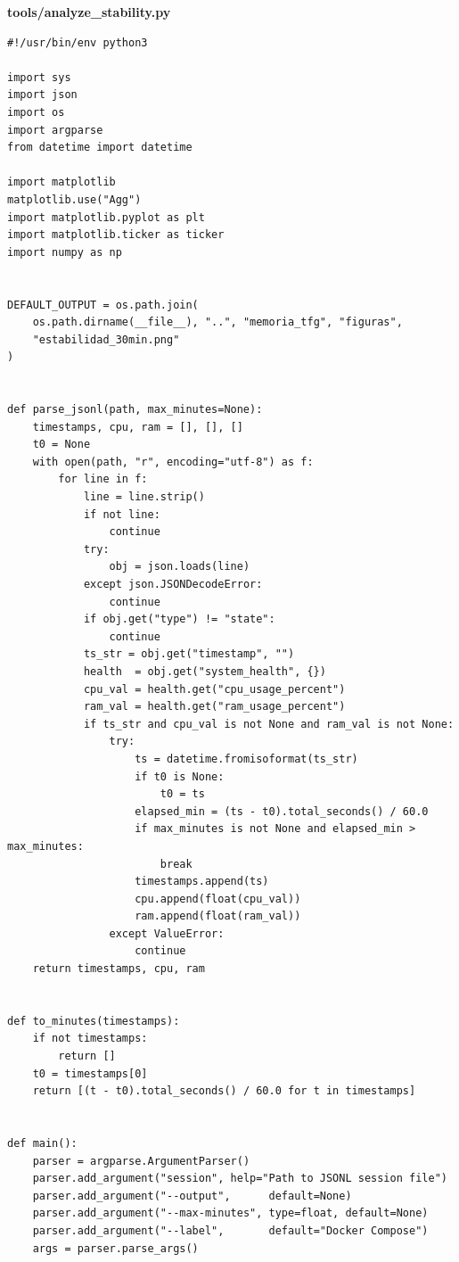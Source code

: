 \clearpage
\vspace{0.3cm}
\noindent\textbf{\small tools/analyze\_stability.py}
\vspace{0.1cm}

\begin{lstlisting}[style=codefile, language=python3]
#!/usr/bin/env python3

import sys
import json
import os
import argparse
from datetime import datetime

import matplotlib
matplotlib.use("Agg")
import matplotlib.pyplot as plt
import matplotlib.ticker as ticker
import numpy as np


DEFAULT_OUTPUT = os.path.join(
    os.path.dirname(__file__), "..", "memoria_tfg", "figuras",
    "estabilidad_30min.png"
)


def parse_jsonl(path, max_minutes=None):
    timestamps, cpu, ram = [], [], []
    t0 = None
    with open(path, "r", encoding="utf-8") as f:
        for line in f:
            line = line.strip()
            if not line:
                continue
            try:
                obj = json.loads(line)
            except json.JSONDecodeError:
                continue
            if obj.get("type") != "state":
                continue
            ts_str = obj.get("timestamp", "")
            health  = obj.get("system_health", {})
            cpu_val = health.get("cpu_usage_percent")
            ram_val = health.get("ram_usage_percent")
            if ts_str and cpu_val is not None and ram_val is not None:
                try:
                    ts = datetime.fromisoformat(ts_str)
                    if t0 is None:
                        t0 = ts
                    elapsed_min = (ts - t0).total_seconds() / 60.0
                    if max_minutes is not None and elapsed_min > max_minutes:
                        break
                    timestamps.append(ts)
                    cpu.append(float(cpu_val))
                    ram.append(float(ram_val))
                except ValueError:
                    continue
    return timestamps, cpu, ram


def to_minutes(timestamps):
    if not timestamps:
        return []
    t0 = timestamps[0]
    return [(t - t0).total_seconds() / 60.0 for t in timestamps]


def main():
    parser = argparse.ArgumentParser()
    parser.add_argument("session", help="Path to JSONL session file")
    parser.add_argument("--output",      default=None)
    parser.add_argument("--max-minutes", type=float, default=None)
    parser.add_argument("--label",       default="Docker Compose")
    args = parser.parse_args()


\end{lstlisting}
